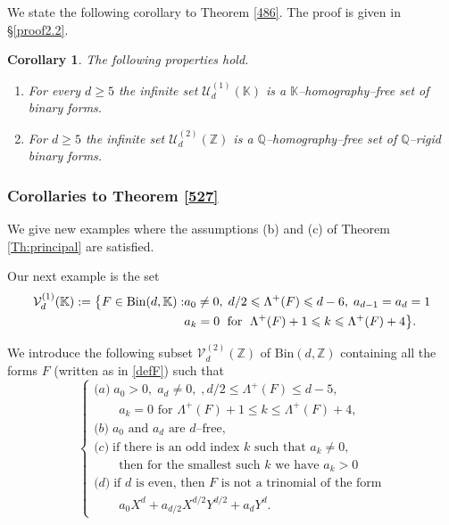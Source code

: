 \documentclass[10pt]{article}
\newtheorem{corollary}[theorem]{Corollary}
\theoremstyle{definition}
\numberwithin{equation}{section}
\newcommand {\Q}{{\mathbb{Q}}}
\newcommand {\Z}{{\mathbb{Z}}}
\newcommand {\K}{{\mathbb{K}}}
\newcommand{\Bin}{\mathrm {Bin}}
\begin{document}
We state the following corollary to Theorem \ref{486}. The proof is given in \S \ref{proof2.2}. 
 
\begin{corollary} \label{Corollary2star}
The following properties hold.
\begin{enumerate} 
\item For every $d\geqslant 5$ 
the infinite set $\mathcal U^{(1)}_{d} (\K)$
is a $\K$--homography--free set of binary forms.
\item For $d \geqslant 5$
the infinite set $\mathcal U^{(2)}_d (\Z)$ is a $\Q$--homography--free set of $\Q$--rigid binary forms.
\end{enumerate}
\end{corollary}
 
\subsubsection{Corollaries to Theorem \ref{527}}

We give new examples where the assumptions (b) and (c) of Theorem \ref{Th:principal} are satisfied.
 
Our next example is the set 
\begin{align}\label{defVd1}
\mathcal V^{(1)}_{d}(\K):= 
\bigl\{ F\in \Bin (d, \K) : &a_0\neq 0, \; d/2\leqslant \Lambda^+ (F)\leqslant d-6, \; a_{d-1}= a_d =1
\\
\notag
& 
a_{k}=0\; \text{ for } \; \Lambda^+ (F)+1\leqslant k \leqslant \Lambda^+ (F) +4
 \bigr\}.
\end{align}
 
We introduce the following subset $\mathcal V_d^{(2)} (\Z)$ of $\Bin  (d, \Z)$ containing all the forms $F$ (written as in \eqref{defF}) such that
\begin{equation}\label{defVd2}
\begin{cases}
{\mathrm (a)}\;
a_0>0, \; a_d\not=0, \;, d/2\leqslant \Lambda^+ (F)\leqslant d-5, \; 
 \\
 \qquad
 a_{k}=0 \text{ for } \Lambda^+ (F)+1\leqslant k \leqslant \Lambda^+ (F) +4,
\\
{\mathrm (b)}\;
a_0 \text{ and } a_d \text{ are $d$--free},
\\
{\mathrm (c)}\;
\text{if there is an odd index $k$ such that $a_k\not=0$}, 
\\
\qquad \text{then for the smallest such $k$ we have } a_k>0
 \\
{\mathrm(d)} \;
 \text {if $d$ is even, then $F$ is not a trinomial of the form}
 \\
 \qquad
a_0 X^d + a_{d/2} X^{d/2} Y^{d/2} + a_d Y^d. 
\end{cases}
\end{equation}
\end{document}
